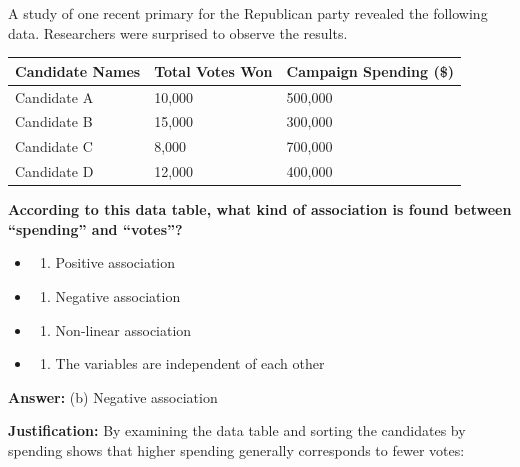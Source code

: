 \documentclass[
  11pt,
]{article}
\providecommand{\tightlist}{%
  \setlength{\itemsep}{0pt}\setlength{\parskip}{0pt}}
\begin{document}
A study of one recent primary for the Republican party revealed the
following data. Researchers were surprised to observe the results.

\begin{longtable}[]{@{}lll@{}}
\toprule\noalign{}
Candidate Names & Total Votes Won & Campaign Spending (\$) \\
\midrule\noalign{}
\endhead
\bottomrule\noalign{}
\endlastfoot
Candidate A & 10,000 & 500,000 \\
Candidate B & 15,000 & 300,000 \\
Candidate C & 8,000 & 700,000 \\
Candidate D & 12,000 & 400,000 \\
\end{longtable}

\textbf{According to this data table, what kind of association is found
between ``spending'' and ``votes''?}

\begin{itemize}
\tightlist
\item
  \begin{enumerate}
  \def\labelenumi{(\alph{enumi})}
  \tightlist
  \item
    Positive association
  \end{enumerate}
\item
  \begin{enumerate}
  \def\labelenumi{(\alph{enumi})}
  \setcounter{enumi}{1}
  \tightlist
  \item
    Negative association
  \end{enumerate}
\item
  \begin{enumerate}
  \def\labelenumi{(\alph{enumi})}
  \setcounter{enumi}{2}
  \tightlist
  \item
    Non-linear association
  \end{enumerate}
\item
  \begin{enumerate}
  \def\labelenumi{(\alph{enumi})}
  \setcounter{enumi}{3}
  \tightlist
  \item
    The variables are independent of each other
  \end{enumerate}
\end{itemize}

\textbf{Answer:} (b) Negative association

\textbf{Justification:} By examining the data table and sorting the
candidates by spending shows that higher spending generally corresponds
to fewer votes:
\end{document}

